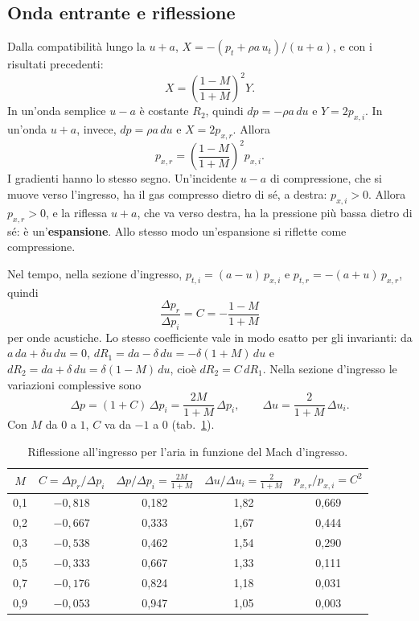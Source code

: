 \documentclass[11pt,a4paper]{article}
\newcommand{\Ru}{R_1}
\newcommand{\Rd}{R_2}
\newcommand{\uma}{u-a}
\newcommand{\upa}{u+a}
\newcommand{\Cr}{C}
\begin{document}
\subsection{Onda entrante e riflessione}
Dalla compatibilità lungo la $\upa$, $X=-(p_t+\rho a\,u_t)/(u+a)$, e con i risultati precedenti:
\[
  X=\left(\frac{1-M}{1+M}\right)^2 Y .
\]
In un'onda semplice $\uma$ è costante $\Rd$, quindi $dp=-\rho a\,du$ e $Y=2p_{x,i}$. In un'onda $\upa$, invece,
$dp=\rho a\,du$ e $X=2p_{x,r}$. Allora
\[
  p_{x,r}=\left(\frac{1-M}{1+M}\right)^2 p_{x,i}.
\]
I gradienti hanno lo stesso segno. Un'incidente $\uma$ di compressione, che si muove verso l'ingresso, ha il gas
compresso dietro di sé, a destra: $p_{x,i}>0$. Allora $p_{x,r}>0$, e la riflessa $\upa$, che va verso destra, ha la
pressione più bassa dietro di sé: è un'\textbf{espansione}. Allo stesso modo un'espansione si riflette come
compressione.

Nel tempo, nella sezione d'ingresso, $p_{t,i}=(a-u)\,p_{x,i}$ e $p_{t,r}=-(a+u)\,p_{x,r}$, quindi
\[
  \boxed{\;\frac{\Delta p_r}{\Delta p_i}=\Cr=-\frac{1-M}{1+M}\;}
\]
per onde acustiche. Lo stesso coefficiente vale in modo esatto per gli invarianti: da $a\,da+\delta u\,du=0$,
$d\Ru=da-\delta\,du=-\delta(1+M)\,du$ e $d\Rd=da+\delta\,du=\delta(1-M)\,du$, cioè $d\Rd=\Cr\,d\Ru$. Nella sezione
d'ingresso le variazioni complessive sono
\[
  \Delta p=(1+\Cr)\,\Delta p_i=\frac{2M}{1+M}\,\Delta p_i,\qquad
  \Delta u=\frac{2}{1+M}\,\Delta u_i .
\]
Con $M$ da $0$ a $1$, $\Cr$ va da $-1$ a $0$ (tab.~\ref{tab:C}).

\begin{table}[H]
  \centering
  \begin{tabular}{ccccc}
    \toprule
    $M$ & $\Cr=\Delta p_r/\Delta p_i$ & $\Delta p/\Delta p_i=\frac{2M}{1+M}$ & $\Delta u/\Delta u_i=\frac{2}{1+M}$ &
    $p_{x,r}/p_{x,i}=\Cr^2$ \\
    \midrule
    0,1 & $-0{,}818$ & 0,182 & 1,82 & 0,669 \\
    0,2 & $-0{,}667$ & 0,333 & 1,67 & 0,444 \\
    0,3 & $-0{,}538$ & 0,462 & 1,54 & 0,290 \\
    0,5 & $-0{,}333$ & 0,667 & 1,33 & 0,111 \\
    0,7 & $-0{,}176$ & 0,824 & 1,18 & 0,031 \\
    0,9 & $-0{,}053$ & 0,947 & 1,05 & 0,003 \\
    \bottomrule
  \end{tabular}
  \caption{Riflessione all'ingresso per l'aria in funzione del Mach d'ingresso.}
  \label{tab:C}
\end{table}
\end{document}
